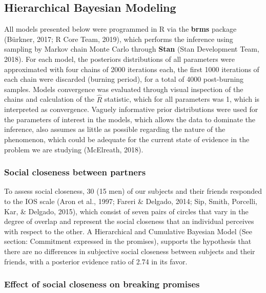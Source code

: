 \documentclass[12pt,]{article}
\begin{document}
\hypertarget{hierarchical-bayesian-modeling}{%
\subsection{Hierarchical Bayesian
Modeling}\label{hierarchical-bayesian-modeling}}

All models presented below were programmed in R via the \textbf{brms}
package (Bürkner, 2017; R Core Team, 2019), which performs the inference
using sampling by Markov chain Monte Carlo through \textbf{Stan} (Stan
Development Team, 2018). For each model, the posteriors distributions of
all parameters were approximated with four chains of 2000 iterations
each, the first 1000 iterations of each chain were discarded (burning
period), for a total of 4000 post-burning samples. Models convergence
was evaluated through visual inspection of the chains and calculation of
the \(\hat{R}\) statistic, which for all parameters was 1, which is
interpreted as convergence. Vaguely informative prior distributions were
used for the parameters of interest in the models, which allows the data
to dominate the inference, also assumes as little as possible regarding
the nature of the phenomenon, which could be adequate for the current
state of evidence in the problem we are studying (McElreath, 2018).

\hypertarget{social-closeness-between-partners}{%
\subsubsection{Social closeness between
partners}\label{social-closeness-between-partners}}

To assess social closeness, 30 (15 men) of our subjects and their
friends responded to the IOS scale (Aron et al., 1997; Fareri \&
Delgado, 2014; Sip, Smith, Porcelli, Kar, \& Delgado, 2015), which
consist of seven pairs of circles that vary in the degree of overlap and
represent the social closeness that an individual perceives with respect
to the other. A Hierarchical and Cumulative Bayesian Model (See section:
Commitment expressed in the promises), supports the hypothesis that
there are no differences in subjective social closeness between subjects
and their friends, with a posterior evidence ratio of 2.74 in its favor.

\hypertarget{effect-of-social-closeness-on-breaking-promises}{%
\subsubsection{Effect of social closeness on breaking
promises}\label{effect-of-social-closeness-on-breaking-promises}}
\end{document}
